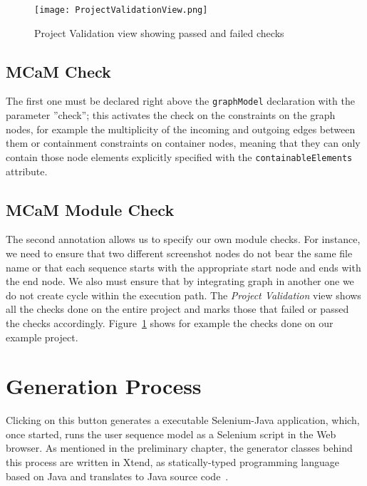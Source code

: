 \begin{figure}[h]
    \centering
    \texttt{[image: ProjectValidationView.png]}
    \caption{Project Validation view showing passed and failed checks}
    \label{fig:modelChecks}
\end{figure}

\subsection{MCaM Check}\label{sec:mcamCheck}

The first one must be declared right above the \lstinline[language=MGL]{graphModel} declaration with the parameter ''check''; this activates the check on the constraints on the graph nodes, for example the multiplicity of the incoming and outgoing edges between them or containment constraints on container nodes, meaning that they can only contain those node elements explicitly specified with the \lstinline[language=MGL]{containableElements} attribute. 

\subsection{MCaM Module Check}\label{sec:mcamModCheck}
The second annotation allows us to specify our own module checks. For instance, we need to ensure that two different screenshot nodes do not bear the same file name or that each sequence starts with the appropriate start node and ends with the end node. We also must ensure that by integrating graph in another one we do not create cycle within the execution path. The \textit{Project Validation} view shows all the checks done on the entire project and marks those that failed or passed the checks accordingly. Figure~\ref{fig:modelChecks} shows for example the checks done on our example project.

\section{Generation Process}\label{sec:GenProcess}

Clicking on this button generates a executable Selenium-Java application, which, once started, runs the user sequence model  as a Selenium script in the Web browser. As mentioned in the preliminary chapter, the generator classes behind this process are written in Xtend, as statically-typed programming language based on Java and translates to Java source code~\cite{Xtend}. 

